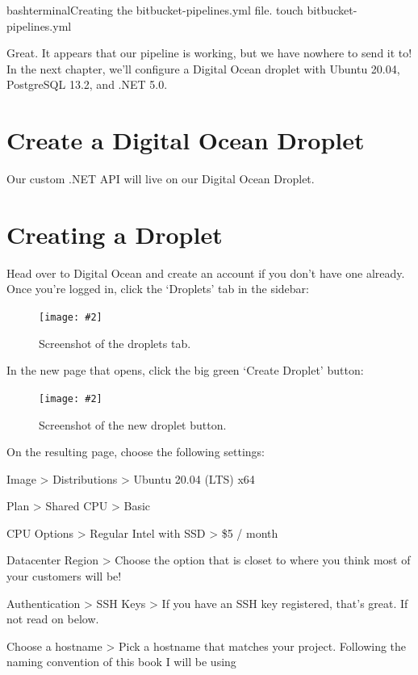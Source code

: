 \documentclass[paper=6in:9in,pagesize=pdftex,headinclude=on,footinclude=on,12pt]{scrbook}
\newcommand{\standardfigure}[3]{\begin{figure}[H]\begin{center}\texttt{[image: \#2]}\caption{#3}\label{fig:#2}\end{center}\end{figure}}
\begin{document}
\begin{codeInput}{bash}{terminal}{Creating the bitbucket-pipelines.yml file.}
touch bitbucket-pipelines.yml  
\end{codeInput}

Great. It appears that our pipeline is working, but we have nowhere to send it to! In the next chapter, we'll configure a Digital Ocean droplet with Ubuntu 20.04, PostgreSQL 13.2, and .NET 5.0.

\section{Create a Digital Ocean Droplet}

Our custom .NET API will live on our Digital Ocean Droplet.

\section{Creating a Droplet}

Head over to Digital Ocean and create an account if you don't have one already. Once you're logged in, click the `Droplets' tab in the sidebar:

\standardfigure{\textwidth/2}{droplet/droplets-tab}{Screenshot of the droplets tab.}

In the new page that opens, click the big green `Create Droplet' button:

\standardfigure{\textwidth}{droplet/new-droplet}{Screenshot of the new droplet button.}

On the resulting page, choose the following settings:

\begin{arrows}
\item Image > Distributions > Ubuntu 20.04 (LTS) x64
\item Plan > Shared CPU > Basic
\item CPU Options > Regular Intel with SSD > \$5 / month
\item Datacenter Region > Choose the option that is closet to where you think most of your customers will be!
\item Authentication > SSH Keys > If you have an SSH key registered, that's great. If not read on below.
\item Choose a hostname > Pick a hostname that matches your project. Following the naming convention of this book I will be using 
\end{arrows}
\end{document}
